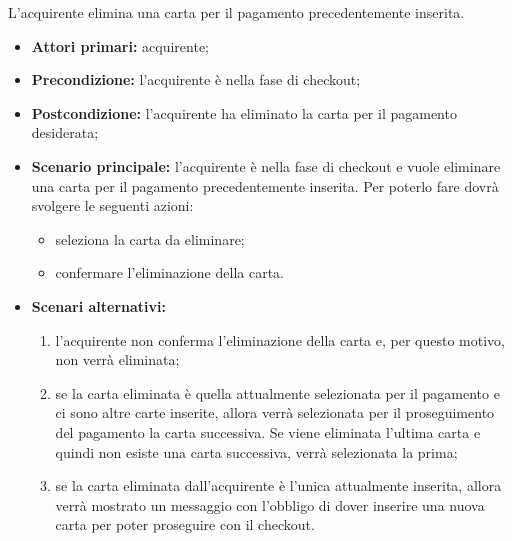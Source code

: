 
L'acquirente elimina una carta per il pagamento precedentemente inserita.
\begin{itemize}
    \item \textbf{Attori primari:} acquirente;
    \item \textbf{Precondizione:} l'acquirente è nella fase di checkout;
    \item \textbf{Postcondizione:} l'acquirente ha eliminato la carta per il pagamento desiderata;
    \item \textbf{Scenario principale:} l'acquirente è nella fase di checkout e vuole eliminare una carta per il pagamento precedentemente inserita. Per poterlo fare dovrà svolgere le seguenti azioni:
        \begin{itemize}
            \item seleziona la carta da eliminare;
            \item confermare l'eliminazione della carta.
        \end{itemize}
    \item \textbf{Scenari alternativi:}
    \begin{enumerate}[label=\lett]
        \item l'acquirente non conferma l'eliminazione della carta e, per questo motivo, non verrà eliminata;
        \item se la carta eliminata è quella attualmente selezionata per il pagamento e ci sono altre carte inserite, allora verrà selezionata per il proseguimento del pagamento la carta successiva. Se viene eliminata l'ultima carta e quindi non esiste una carta successiva, verrà selezionata la prima;
        \item se la carta eliminata dall'acquirente è l'unica attualmente inserita, allora verrà mostrato un messaggio con l'obbligo di dover inserire una nuova carta per poter proseguire con il checkout.
    \end{enumerate}
\end{itemize}


